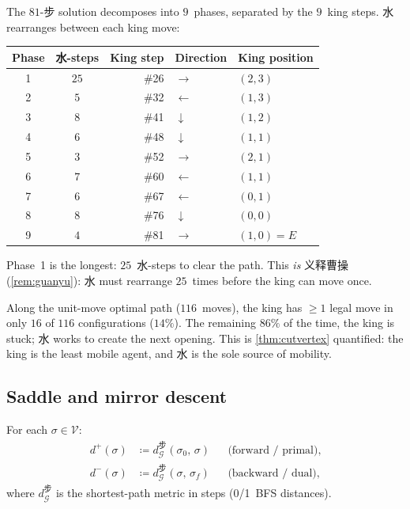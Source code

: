 \begin{proposition}%
\label{prop:phase-decomp}
The $81$-步 solution decomposes into $9$~phases,
separated by the $9$~king steps.
水 rearranges between each king move:
\begin{center}
\small
\begin{tabular}{@{}ccrll@{}}
\toprule
\textbf{Phase} & \textbf{水-steps} &
  \textbf{King step} & \textbf{Direction} &
  \textbf{King position} \\
\midrule
1 & $25$ & \#26 & $\to$ & $(2, 3)$ \\
2 & $5$  & \#32 & $\leftarrow$ & $(1, 3)$ \\
3 & $8$  & \#41 & $\downarrow$ & $(1, 2)$ \\
4 & $6$  & \#48 & $\downarrow$ & $(1, 1)$ \\
5 & $3$  & \#52 & $\to$ & $(2, 1)$ \\
6 & $7$  & \#60 & $\leftarrow$ & $(1, 1)$ \\
7 & $6$  & \#67 & $\leftarrow$ & $(0, 1)$ \\
8 & $8$  & \#76 & $\downarrow$ & $(0, 0)$ \\
9 & $4$  & \#81 & $\to$ & $(1, 0) = E$ \\
\bottomrule
\end{tabular}
\end{center}
Phase~1 is the longest: $25$~水-steps to clear the path.
This \emph{is} 义释曹操 (\cref{rem:guanyu}): 水 must
rearrange $25$~times before the king can move once.
\end{proposition}

\begin{remark}\label{rem:king-freedom}
Along the unit-move optimal path ($116$~moves),
the king has $\geq 1$ legal move in only
$16$ of $116$ configurations ($14\%$).
The remaining $86\%$ of the time, the king is stuck;
水 works to create the next opening.
This is \cref{thm:cutvertex} quantified:
the king is the least mobile agent, and 水 is
the sole source of mobility.
\end{remark}

\subsection*{Saddle and mirror descent}

\begin{definition}%
\label{def:primal-dual}
For each $\sigma \in \mathcal{V}$:
\begin{align}
  d^+(\sigma) &\coloneqq
    d_{\mathcal{G}}^{\text{步}}(\sigma_0,\, \sigma)
    && \text{(forward / primal)}, \label{eq:dplus} \\
  d^-(\sigma) &\coloneqq
    d_{\mathcal{G}}^{\text{步}}(\sigma,\, \sigma_f)
    && \text{(backward / dual)}, \label{eq:dminus}
\end{align}
where $d_{\mathcal{G}}^{\text{步}}$ is the shortest-path
metric in steps (0/1~BFS distances).
\end{definition}

